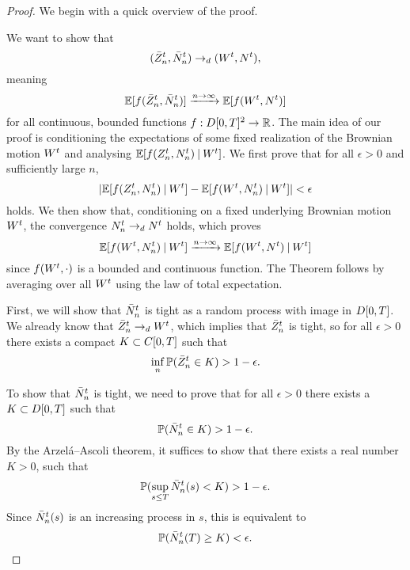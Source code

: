 \begin{proof}

We begin with a quick overview of the proof.

We want to show that
\begin{equation}
(\bar{Z}^t_n, \bar{N}_n^t) \rightarrow_d (W^t, N^t),
\end{equation}
meaning 
\begin{equation}
\mathbb{E}[f(\bar{Z}^t_n, \bar{N}_n^t)] \xrightarrow{n \rightarrow \infty} \mathbb{E}[f(W^t, N^t)]
\end{equation}
for all continuous, bounded functions $f:D[0,T]^2\rightarrow\mathbb{R}$.
The main idea of our proof is conditioning the expectations of some fixed realization of the Brownian motion $W^t$ and analysing  $\mathbb{E}[f(Z_n^t, N_n^t) \: | \: W^t]$.
We first prove that for all $\epsilon > 0$ and sufficiently large $n$,
\begin{equation}
	| \mathbb{E}[f(Z_n^t, N_n^t) \: | \: W^t] -  \mathbb{E}[f(W^t, N_n^t) \: | \: W^t] | < \epsilon
\end{equation}
holds.
We then show that, conditioning on a fixed underlying Brownian motion $W^t$, the convergence $N_n^t \rightarrow_d N^t$ holds,
which proves
\begin{equation}
	\mathbb{E}[f(W^t, N_n^t) \: | \: W^t] \xrightarrow{n \rightarrow \infty} \mathbb{E}[f(W^t, N^t ) \: | \: W^t]
\end{equation}
since $f(W^t, \cdot)$ is a bounded and continuous function.
The Theorem follows by averaging over all $W^t$ using the law of total expectation.

First, we will show that $\bar{N}_n^t$ is tight as a random process with image in $D[0, T]$.
We already know that $\bar{Z}^t_n \rightarrow_d W^t$, which implies that $\bar{Z}^t_n$ is tight, 
so for all $\epsilon>0$ there exists a compact $K \subset C[0, T]$ such that
\begin{equation} \label{E: rznt tight}
\inf_n \mathbb{P} ( \bar{Z}^t_n \in K) > 1 - \epsilon.
\end{equation}

To show that $\bar{N}_n^t$ is tight, we need to prove that for all $\epsilon>0$ there exists a $K \subset D[0, T]$ such that
\begin{equation}
	\mathbb{P}(\bar{N}_n^t \in K) > 1 - \epsilon.
\end{equation}
By the Arzelá–Ascoli theorem, it suffices to show that there exists a real number $K>0$, such that
\begin{equation}
	\mathbb{P}( \sup_{s \leq T} \bar{N}_n^t(s) < K ) > 1 - \epsilon. 
\end{equation}
Since $\bar{N}_n^t(s)$ is an increasing process in $s$, this is equivalent to
\begin{equation}
	\mathbb{P}( \bar{N}_n^t(T) \geq K ) < \epsilon.
\end{equation}


\end{proof}
